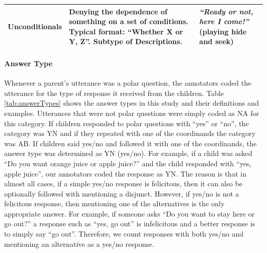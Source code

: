\documentclass[floatsintext,man]{apa6}
\theoremstyle{definition}
\theoremstyle{definition}
\theoremstyle{definition}
\theoremstyle{remark}
\begin{document}
\begin{longtable}[]{@{}lll@{}}
\begin{minipage}[t]{0.14\columnwidth}\raggedright\strut
Unconditionals\strut
\end{minipage} & \begin{minipage}[t]{0.44\columnwidth}\raggedright\strut
Denying the dependence of something on a set of conditions. Typical
format: \enquote{Whether X or Y, Z}. Subtype of Descriptions.\strut
\end{minipage} & \begin{minipage}[t]{0.33\columnwidth}\raggedright\strut
\emph{\enquote{Ready or not, here I come!}} (playing hide and
seek)\strut
\end{minipage}\tabularnewline
\bottomrule
\end{longtable}

\paragraph{Answer Type}\label{answer-type}

Whenever a parent's utterance was a polar question, the annotators coded
the utterance for the type of response it received from the children.
Table \ref{tab:answerTypes} shows the answer types in this study and
their definitions and examples. Utterances that were not polar questions
were simply coded as NA for this category. If children responded to
polar questions with \enquote{yes} or \enquote{no}, the category was YN
and if they repeated with one of the coordinands the category was AB. If
children said yes/no and followed it with one of the coordinands, the
answer type was determined as YN (yes/no). For example, if a child was
asked \enquote{Do you want orange juice or apple juice?} and the child
responded with \enquote{yes, apple juice}, our annotators coded the
response as YN. The reason is that in almost all cases, if a simple
yes/no response is felicitous, then it can also be optionally followed
with mentioning a disjunct. However, if yes/no is not a felicitous
response, then mentioning one of the alternatives is the only
appropriate answer. For example, if someone asks \enquote{Do you want to
stay here or go out?} a response such as \enquote{yes, go out} is
infelicitous and a better response is to simply say \enquote{go out}.
Therefore, we count responses with both yes/no and mentioning an
alternative as a yes/no response.
\end{document}
